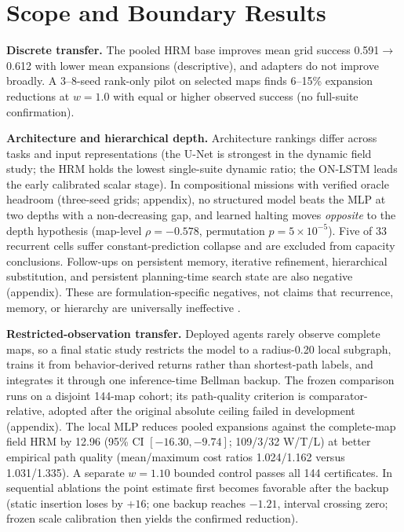 \documentclass[letterpaper]{article} %
\begin{document}
\section{Scope and Boundary Results}

\textbf{Discrete transfer.} The pooled HRM base improves mean grid success 0.591$\to$0.612 with lower mean expansions (descriptive), and adapters do not improve broadly. A 3--8-seed rank-only pilot on selected maps finds 6--15\% expansion reductions at $w{=}1.0$ with equal or higher observed success (no full-suite confirmation).

\textbf{Architecture and hierarchical depth.} Architecture rankings differ across tasks and input representations (the U-Net is strongest in the dynamic field study; the HRM holds the lowest single-suite dynamic ratio; the ON-LSTM leads the early calibrated scalar stage). In compositional missions with verified oracle headroom (three-seed grids; appendix), no structured model beats the MLP at two depths with a non-decreasing gap, and learned halting moves \emph{opposite} to the depth hypothesis (map-level $\rho{=}-0.578$, permutation $p{=}5\times10^{-5}$). Five of 33 recurrent cells suffer constant-prediction collapse and are excluded from capacity conclusions. Follow-ups on persistent memory, iterative refinement, hierarchical substitution, and persistent planning-time search state are also negative (appendix). These are formulation-specific negatives, not claims that recurrence, memory, or hierarchy are universally ineffective \citep{jolicoeur2025trm,czechowski2021subgoal}.

\textbf{Restricted-observation transfer.} Deployed agents rarely observe complete maps, so a final static study restricts the model to a radius-0.20 local subgraph, trains it from behavior-derived returns rather than shortest-path labels, and integrates it through one inference-time Bellman backup. The frozen comparison runs on a disjoint 144-map cohort; its path-quality criterion is comparator-relative, adopted after the original absolute ceiling failed in development (appendix). The local MLP reduces pooled expansions against the complete-map field HRM by 12.96 (95\% CI $[-16.30,-9.74]$; 109/3/32 W/T/L) at better empirical path quality (mean/maximum cost ratios 1.024/1.162 versus 1.031/1.335). A separate $w{=}1.10$ bounded control passes all 144 certificates. In sequential ablations the point estimate first becomes favorable after the backup (static insertion loses by $+16$; one backup reaches $-1.21$, interval crossing zero; frozen scale calibration then yields the confirmed reduction).
\end{document}
